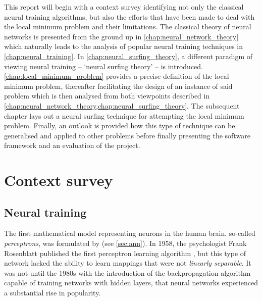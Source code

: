 This report will begin with a context survey identifying not only the classical neural training algorithms, but also the efforts that have been made to deal with the local minimum problem and their limitations.
The classical theory of neural networks is presented from the ground up in \ref{chap:neural_network_theory} which naturally leads to the analysis of popular neural training techniques in \ref{chap:neural_training}.
In \ref{chap:neural_surfing_theory}, a different paradigm of viewing neural training -- `neural surfing theory' -- is introduced.
\ref{chap:local_minimum_problem} provides a precise definition of the local minimum problem, thereafter facilitating the design of an instance of said problem which is then analysed from both viewpoints described in \ref{chap:neural_network_theory,chap:neural_surfing_theory}.
The subsequent chapter lays out a neural surfing technique for attempting the local minimum problem.
Finally, an outlook is provided how this type of technique can be generalised and applied to other problems before finally presenting the software framework and an evaluation of the project.

\section{Context survey}
\subsection{Neural training}
\label{sec:context_anns}
The first mathematical model representing neurons in the human brain, so-called \textit{perceptrons}, was formulated by \textcite{mcculloch1943} (see \ref{sec:ann}).
In 1958, the psychologist Frank Rosenblatt published the first perceptron learning algorithm \cite{rosenblatt1958}, but this type of network lacked the ability to learn mappings that were not \textit{linearly separable}.
It was not until the 1980s with the introduction of the backpropagation algorithm capable of training networks with hidden layers, that neural networks experienced a substantial rise in popularity.

